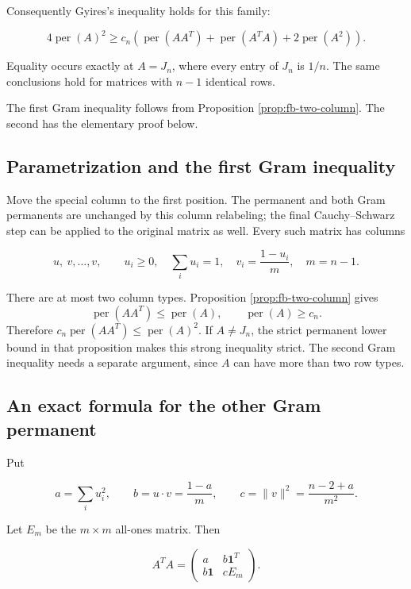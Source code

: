 \documentclass[11pt,a4paper]{article}
\theoremstyle{definition}
\theoremstyle{remark}
\begin{document}
Consequently Gyires's inequality holds for this family:

\begin{equation}\label{eq:e-2}
4\operatorname{per}(A)^2
\ge c_n\left(\operatorname{per}(AA^T)+\operatorname{per}(A^TA)
+2\operatorname{per}(A^2)\right).
\end{equation}

Equality occurs exactly at \(A=J_n\), where every entry of \(J_n\) is
\(1/n\). The same conclusions hold for matrices with \(n-1\) identical
rows.

The first Gram inequality follows from Proposition
\ref{prop:fb-two-column}. The second has the elementary proof below.

\subsection{Parametrization and the first Gram
inequality}\label{special-parametrization-and-the-first-gram-inequality}

Move the special column to the first position. The permanent and both
Gram permanents are unchanged by this column relabeling; the final
Cauchy--Schwarz step can be applied to the original matrix as well.
Every such matrix has columns

\[
u,\ v,\ldots,v,\qquad
u_i\ge0,\quad \sum_i u_i=1,\quad
v_i=\frac{1-u_i}{m},\quad m=n-1.
\]

There are at most two column types. Proposition \ref{prop:fb-two-column}
gives \[
\operatorname{per}(AA^T)\le\operatorname{per}(A),\qquad\operatorname{per}(A)\ge c_n.
\] Therefore \(c_n\operatorname{per}(AA^T)\le\operatorname{per}(A)^2\).
If \(A\ne J_n\), the strict permanent lower bound in that proposition
makes this strong inequality strict. The second Gram inequality needs a
separate argument, since \(A\) can have more than two row types.

\subsection{An exact formula for the other Gram
permanent}\label{special-an-exact-formula-for-the-other-gram-permanent}

Put

\[
a=\sum_i u_i^2,\qquad
b=u\cdot v=\frac{1-a}{m},\qquad
c=\|v\|^2=\frac{n-2+a}{m^2}.
\]

Let \(E_m\) be the \(m\times m\) all-ones matrix. Then

\[
A^TA=
\begin{pmatrix}
a&b\mathbf1^T\\
b\mathbf1&cE_m
\end{pmatrix}.
\]
\end{document}
